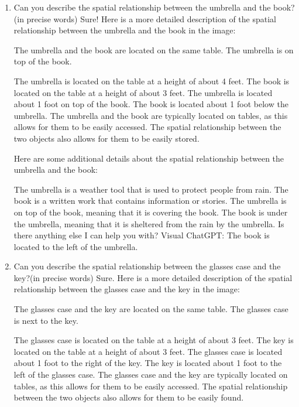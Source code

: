 \begin{enumerate}
    \item Can you describe the spatial relationship between the umbrella and the book?(in precise words)
    \subitem Sure! Here is a more detailed description of the spatial relationship between the umbrella and the book in the image:

    The umbrella and the book are located on the same table. The umbrella is on top of the book.
    
    The umbrella is located on the table at a height of about 4 feet.
    The book is located on the table at a height of about 3 feet.
    The umbrella is located about 1 foot on top of the book.
    The book is located about 1 foot below the umbrella.
    The umbrella and the book are typically located on tables, as this allows for them to be easily accessed. The spatial relationship between the two objects also allows for them to be easily stored.
    
    Here are some additional details about the spatial relationship between the umbrella and the book:
    
    The umbrella is a weather tool that is used to protect people from rain.
    The book is a written work that contains information or stories.
    The umbrella is on top of the book, meaning that it is covering the book.
    The book is under the umbrella, meaning that it is sheltered from the rain by the umbrella.
    Is there anything else I can help you with?
    \subitem Visual ChatGPT: The book is located to the left of the umbrella.
    \item Can you describe the spatial relationship between the glasses case and the key?(in precise words)
    \subitem Sure. Here is a more detailed description of the spatial relationship between the glasses case and the key in the image:

    The glasses case and the key are located on the same table. The glasses case is next to the key.
    
    The glasses case is located on the table at a height of about 3 feet.
    The key is located on the table at a height of about 3 feet.
    The glasses case is located about 1 foot to the right of the key.
    The key is located about 1 foot to the left of the glasses case.
    The glasses case and the key are typically located on tables, as this allows for them to be easily accessed. The spatial relationship between the two objects also allows for them to be easily found.
    

\end{enumerate}
